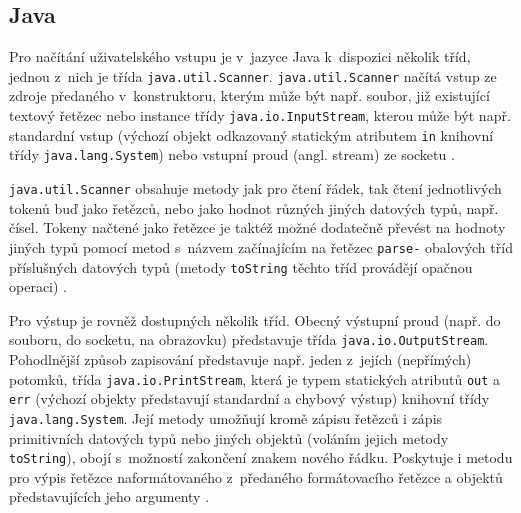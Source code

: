 \documentclass[onepage, a4paper, 12pt]{bakalarka}
\begin{document}
\subsection{Java}
Pro načítání uživatelského vstupu je v~jazyce Java k~dispozici několik tříd, jednou z~nich je třída \texttt{java.util.Scanner}. \texttt{java.util.Scanner} načítá vstup ze zdroje předaného v~konstruktoru, kterým může být např. soubor, již existující textový řetězec nebo instance třídy \texttt{java.io.InputStream}, kterou může být např. standardní vstup (výchozí objekt odkazovaný statickým atributem \texttt{in} knihovní třídy \texttt{java.lang.System}) nebo vstupní proud (angl. stream) ze socketu \cite{java-guide-scanner, java-guide-inputstream, java-guide-system}.\par
\texttt{java.util.Scanner} obsahuje metody jak pro čtení řádek, tak čtení jednotlivých tokenů buď jako řetězců, nebo jako hodnot různých jiných datových typů, např. čísel. Tokeny načtené jako řetězce je taktéž možné dodatečně převést na hodnoty jiných typů pomocí metod s~názvem začínajícím na řetězec \texttt{parse-} obalových tříd příslušných datových typů (metody \texttt{toString} těchto tříd provádějí opačnou operaci) \cite{java-guide-scanner, java-guide-byte, java-guide-short, java-guide-integer, java-guide-long, java-guide-float, java-guide-double, java-guide-boolean, java-guide-character}.\par
Pro výstup je rovněž dostupných několik tříd. Obecný výstupní proud (např. do souboru, do socketu, na obrazovku) představuje třída \texttt{java.io\-.OutputStream}. Pohodlnější způsob zapisování představuje např. jeden z~jejích (nepřímých) potomků, třída \texttt{java.io.PrintStream}, která je typem statických atributů \texttt{out} a \texttt{err} (výchozí objekty představují standardní a chybový výstup) knihovní třídy \texttt{java.lang.System}. Její metody umožňují kromě zápisu řetězců i zápis primitivních datových typů nebo jiných objektů (voláním jejich metody \texttt{toString}), obojí s~možností zakončení znakem nového řádku. Poskytuje i metodu pro výpis řetězce naformátovaného z~předaného formátovacího řetězce a objektů představujících jeho argumenty \cite{java-guide-outputstream, java-guide-printstream, java-guide-system}.
\end{document}

